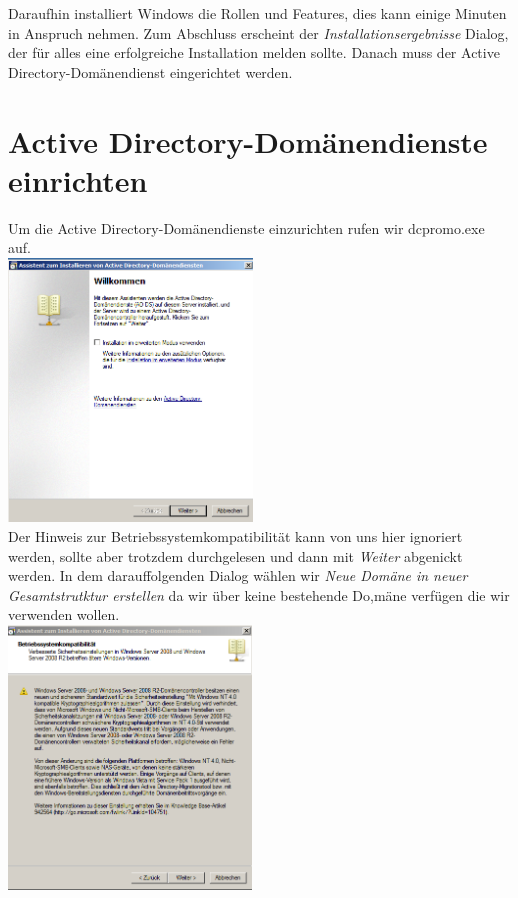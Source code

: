 \documentclass[12pt,a4paper,titlepage]{scrartcl} %
\begin{document}
Daraufhin installiert Windows die Rollen und Features, dies kann einige Minuten in Anspruch nehmen. Zum Abschluss erscheint der \emph{Installationsergebnisse} Dialog, der für alles eine erfolgreiche Installation melden sollte. Danach muss der Active Directory-Domänendienst eingerichtet werden.
 
 \newpage
 \section{Active Directory-Domänendienste einrichten}
Um die Active Directory-Domänendienste einzurichten rufen wir dcpromo.exe auf.\\

	\includegraphics[height=7cm]{Bilder/014(dcpromo_exe01)}\\
	
Der Hinweis zur Betriebssystemkompatibilität kann von uns hier ignoriert werden, sollte aber trotzdem durchgelesen und dann mit \emph{Weiter} abgenickt werden. In dem darauffolgenden Dialog wählen wir \emph{Neue Domäne in neuer Gesamtstrutktur erstellen} da wir über keine bestehende Do,mäne verfügen die wir verwenden wollen.\\

	\includegraphics[height=7cm]{Bilder/015(dcpromo_exe02)}\\
	
\end{document}

